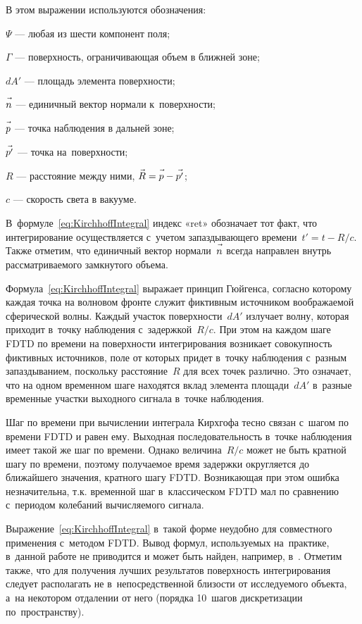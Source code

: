 \noindent
В этом выражении используются обозначения:
\begin{where}
\item $\Psi$ --- любая из шести компонент поля;
\item $\Gamma$ --- поверхность, ограничивающая объем в ближней зоне;
\item $dA'$ --- площадь элемента поверхности;
\item $\vec{n\mathstrut}$ --- единичный вектор нормали к~поверхности;
\item $\vec{p\mathstrut}$ --- точка наблюдения в дальней зоне;
\item $\vec{p'\mathstrut}$ --- точка на~поверхности;
\item $R$ --- расстояние между ними, $\vec{R\mathstrut} = \vec{p\mathstrut}-\vec{p'\mathstrut}$;
\item $c$ --- скорость света в вакууме.
\end{where}

\noindent
В~формуле~\eqref{eq:KirchhoffIntegral} индекс «ret» обозначает тот факт, что
интегрирование осуществляется с~учетом запаздывающего времени~$t'=t-R/c$. Также
отметим, что единичный вектор нормали~$\vec{n\mathstrut}$ всегда направлен внутрь
рассматриваемого замкнутого объема.

Формула~\eqref{eq:KirchhoffIntegral} выражает принцип Гюйгенса, согласно
которому каждая точка на волновом фронте служит фиктивным источником
воображаемой сферической волны. Каждый участок поверхности~$dA'$ излучает волну,
которая приходит в~точку наблюдения с~задержкой~$R/c$. При этом на каждом шаге
FDTD по времени на поверхности интегрирования возникает совокупность фиктивных
источников, поле от которых придет в~точку наблюдения с~разным запаздыванием,
поскольку расстояние~$R$ для всех точек различно. Это означает, что на одном
временном шаге находятся вклад элемента площади~$dA'$ в~разные временные участки
выходного сигнала в~точке наблюдения.

Шаг по времени при вычислении интеграла Кирхгофа тесно связан с~шагом по времени
FDTD и равен ему. Выходная последовательность в~точке наблюдения имеет такой же
шаг по времени. Однако величина~$R/c$ может не быть кратной шагу по времени,
поэтому получаемое время задержки округляется до ближайшего значения, кратного
шагу FDTD. Возникающая при этом ошибка незначительна, т.к. временной шаг
в~классическом FDTD мал по сравнению с~периодом колебаний вычисляемого сигнала.

Выражение~\eqref{eq:KirchhoffIntegral} в~такой форме неудобно для совместного
применения с~методом FDTD. Вывод формул, используемых на~практике, в~данной
работе не приводится и может быть найден, например, в~\cite{bib:Zelenin2006}.
Отметим также, что для получения лучших результатов поверхность интегрирования
следует располагать не в~непосредственной близости от исследуемого объекта, а~на
некотором отдалении от него (порядка 10~шагов дискретизации по~пространству).
